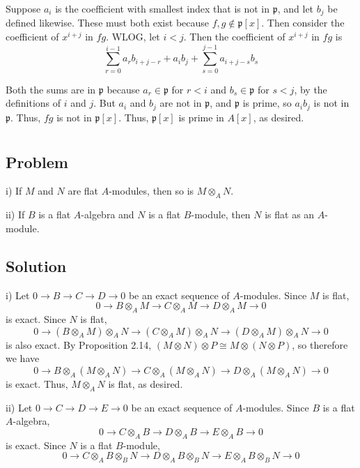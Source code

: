 \documentclass[book,12pt,oneside,openany]{memoir}
\begin{document}
Suppose $a_i$ is the coefficient with smallest index that is not in $\mathfrak{p}$, and let $b_j$ be defined likewise. These must both exist because $f,g \notin \mathfrak{p}[x]$. Then consider the coefficient of $x^{i+j}$ in $fg$. WLOG, let $i < j$. Then the coefficient of $x^{i+j}$ in $fg$ is \[\sum_{r = 0}^{i-1} a_r b_{i+j-r} + a_i b_j + \sum_{s = 0}^{j-1} a_{i+j-s}b_s\]

Both the sums are in $\mathfrak{p}$ because $a_r \in \mathfrak{p}$ for $r < i$ and $b_s \in \mathfrak{p}$ for $s < j$, by the definitions of $i$ and $j$. But $a_i$ and $b_j$ are not in $\mathfrak{p}$, and $\mathfrak{p}$ is prime, so $a_i b_j$ is not in $\mathfrak{p}$. Thus, $fg$ is not in $\mathfrak{p}[x]$. Thus, $\mathfrak{p}[x]$ is prime in $A[x]$, as desired.

\section{}
\subsection{Problem}

i) If $M$ and $N$ are flat $A$-modules, then so is $M \otimes_{A} N $.

ii) If $B$ is a flat $A$-algebra and $N$ is a flat $B$-module, then $N$ is flat as an $A$-module.

\subsection{Solution}

i) Let $0 \rightarrow B \rightarrow C \rightarrow D \rightarrow 0$ be an exact sequence of $A$-modules. Since $M$ is flat, \[0 \rightarrow B \otimes_A M \rightarrow C \otimes_A M \rightarrow D \otimes_A M \rightarrow 0\] is exact. Since $N$ is flat, 
\[0 \rightarrow (B \otimes_A M) \otimes_A N \rightarrow (C \otimes_A M) \otimes_A N \rightarrow (D \otimes_A M) \otimes_A N \rightarrow 0\] is also exact. By Proposition 2.14, $(M \otimes N) \otimes P \cong M \otimes (N \otimes P)$, so therefore we have 
\[0 \rightarrow B \otimes_A (M \otimes_A N) \rightarrow C \otimes_A (M \otimes_A N) \rightarrow D \otimes_A (M \otimes_A N) \rightarrow 0\] is exact. Thus, $M \otimes_A N$ is flat, as desired.

ii) Let $0 \rightarrow C \rightarrow D \rightarrow E \rightarrow 0$ be an exact sequence of $A$-modules. Since $B$ is a flat $A$-algebra, \[0 \rightarrow C \otimes_A B \rightarrow D \otimes_A B \rightarrow E \otimes_A B \rightarrow 0\] is exact. Since $N$ is a flat $B$-module, \[0 \rightarrow C \otimes_A B \otimes_B N \rightarrow D \otimes_A B \otimes_B N \rightarrow E \otimes_A B \otimes_B N \rightarrow 0\] 
\end{document}

